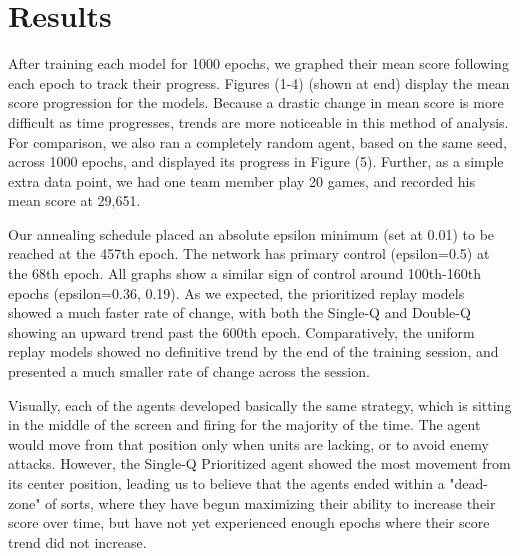 \documentclass[conference]{IEEEtran}
\begin{document}
\section{Results}
After training each model for 1000 epochs, we graphed their mean score following each epoch to track their progress. Figures (1-4) (shown at end) display the mean score progression for the models. Because a drastic change in mean score is more difficult as time progresses, trends are more noticeable in this method of analysis. For comparison, we also ran a completely random agent, based on the same seed, across 1000 epochs, and displayed its progress in Figure (5). Further, as a simple extra data point, we had one team member play 20 games, and recorded his mean score at 29,651. \par
Our annealing schedule placed an absolute epsilon minimum (set at 0.01) to be reached at the 457th epoch. The network has primary control (epsilon=0.5) at the 68th epoch. All graphs show a similar sign of control around 100th-160th epochs (epsilon=0.36, 0.19).
As we expected, the prioritized replay models showed a much faster rate of change, with both the Single-Q and Double-Q showing an upward trend past the 600th epoch. Comparatively, the uniform replay models showed no definitive trend by the end of the training session, and presented a much smaller rate of change across the session. \par
Visually, each of the agents developed basically the same strategy, which is sitting in the middle of the screen and firing for the majority of the time. The agent would move from that position only when units are lacking, or to avoid enemy attacks. However, the Single-Q Prioritized agent showed the most movement from its center position, leading us to believe that the agents ended within a "dead-zone" of sorts, where they have begun maximizing their ability to increase their score over time, but have not yet experienced enough epochs where their score trend did not increase.

\end{document}
